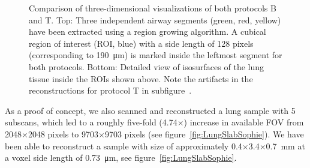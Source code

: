 \begin{figure}[htp]
{%
		}%
	\caption{Comparison of three-dimensional visualizations of both protocols B and T. Top: Three independent airway segments (green, red, yellow) have been extracted using a region growing algorithm. A cubical region of interest (ROI, blue) with a side length of 128 pixels (corresponding to \SI{190}{\micro\meter}) is marked inside the leftmost segment for both protocols. Bottom: Detailed view of isosurfaces of the lung tissue inside the ROIs shown above. Note the artifacts in the reconstructions for protocol T in subfigure~.}%
	\label{fig:BvsT2}%
\end{figure}
\cbend

As a proof of concept, we also scanned and reconstructed a lung sample with 5 subscans, which led to a roughly five-fold (4.74\(\times\)) increase in available FOV from 2048\(\times\)2048 pixels to 9703\(\times\)9703 pixels (see figure~\ref{fig:LungSlabSophie}). We have been able to reconstruct a sample with size of approximately 0.4\(\times\)3.4\(\times\)\SI{0.7}{\milli\meter} at a voxel side length of \SI{0.73}{\micro\meter}, see figure~\ref{fig:LungSlabSophie}.


